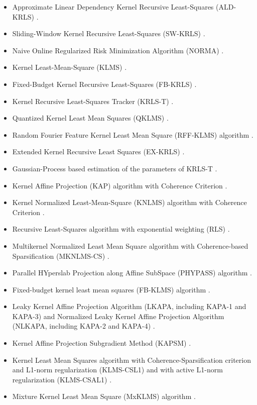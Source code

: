 \documentclass[]{report}
\begin{document}
\begin{itemize}
\item Approximate Linear Dependency Kernel Recursive Least-Squares (ALD-KRLS) \cite{engel2004kernel}.
\item Sliding-Window Kernel Recursive Least-Squares (SW-KRLS) \cite{vanvaerenbergh2006sliding}.
\item Naive Online Regularized Risk Minimization Algorithm (NORMA) \cite{kivinen2004online}.
\item Kernel Least-Mean-Square (KLMS) \cite{liu2008kernel}.
\item Fixed-Budget Kernel Recursive Least-Squares (FB-KRLS) \cite{vanvaerenbergh2010fixed}.
\item Kernel Recursive Least-Squares Tracker (KRLS-T) \cite{vanvaerenbergh2012kernel}.
\item Quantized Kernel Least Mean Squares (QKLMS) \cite{chen2012quantized}.
\item Random Fourier Feature Kernel Least Mean Square (RFF-KLMS) algorithm \cite{singh2012random}.
\item Extended Kernel Recursive Least Squares (EX-KRLS) \cite{liu2009extended}.
\item Gaussian-Process based estimation of the parameters of KRLS-T \cite{vanvaerenbergh2012estimation}.
\item Kernel Affine Projection (KAP) algorithm with Coherence Criterion \cite{richard2009online}.
\item Kernel Normalized Least-Mean-Square (KNLMS) algorithm with Coherence Criterion \cite{richard2009online}.
\item Recursive Least-Squares algorithm with exponential weighting (RLS) \cite{sayed2003fundamentals}.
\item Multikernel Normalized Least Mean Square algorithm with Coherence-based Sparsification (MKNLMS-CS) \cite{yukawa2012multikernel}.
\item Parallel HYperslab Projection along Affine SubSpace (PHYPASS) algorithm \cite{takizawa2013efficient}.
\item Fixed-budget kernel least mean squares (FB-KLMS) algorithm \cite{rzepka2012fixed}.
\item Leaky Kernel Affine Projection Algorithm (LKAPA, including KAPA-1 and KAPA-3) and Normalized Leaky Kernel Affine Projection Algorithm (NLKAPA, including KAPA-2 and KAPA-4) \cite{liu2008kernel}.
\item Kernel Affine Projection Subgradient Method (KAPSM) \cite{slavakis2008online}.
\item Kernel Least Mean Squares algorithm with Coherence-Sparsification criterion and L1-norm regularization (KLMS-CSL1) and with active L1-norm regularization (KLMS-CSAL1) \cite{gao2013kernel}.
\item  Mixture Kernel Least Mean Square (MxKLMS) algorithm \cite{pokharel2013mixture}.
\end{itemize}
\end{document}

